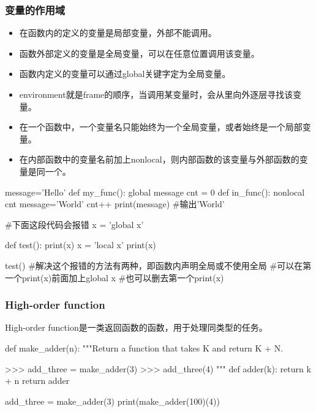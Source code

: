 \documentclass{article}
\begin{document}
      \subsubsection{变量的作用域}
        \begin{itemize}
          \item 在函数内的定义的变量是局部变量，外部不能调用。
          \item 函数外部定义的变量是全局变量，可以在任意位置调用该变量。
          \item 函数内定义的变量可以通过global关键字定为全局变量。
          \item environment就是frame的顺序，当调用某变量时，会从里向外逐层寻找该变量。
          \item 在一个函数中，一个变量名只能始终为一个全局变量，或者始终是一个局部变量。
          \item 在内部函数中的变量名前加上nonlocal，则内部函数的该变量与外部函数的变量是同一个。
        \end{itemize}

        \begin{codeblock}[language=python, caption={local and global}]
          message='Hello'
          def my_func():
            global message
            cnt = 0
            def in_func():
              nonlocal cnt
            message='World'
            cnt++
          print(message) #输出'World'

          #下面这段代码会报错
          x = 'global x'

          def test():
            print(x)
            x = 'local x'
            print(x)
          
          test()
          #解决这个报错的方法有两种，即函数内声明全局或不使用全局
          #可以在第一个print(x)前面加上global x
          #也可以删去第一个print(x)
        \end{codeblock}

      \subsubsection{High-order function}
        High-order function是一类返回函数的函数，用于处理同类型的任务。
        \begin{codeblock}[language=python, caption={High-order function}]
          def make_adder(n):
            """Return a function that takes K and return K + N.

            >>> add_three = make_adder(3)
            >>> add_three(4)
            """
            def adder(k):
              return k + n
            return adder

          add_three = make_adder(3)
          print(make_adder(100)(4))
        \end{codeblock}
\end{document}
